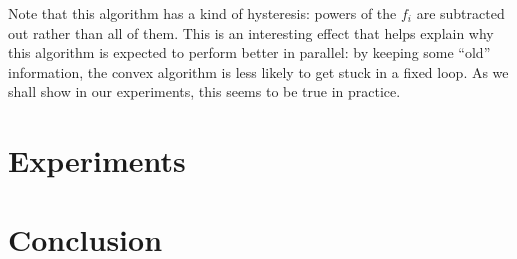 \documentclass[times, 10pt,twocolumn]{article}
\begin{document}
Note that this algorithm has a kind of hysteresis: powers of the
$f_i$ are subtracted out rather than all of them. This is an
interesting effect that helps explain why this algorithm is
expected to perform better in parallel: by keeping some ``old''
information, the convex algorithm is less likely to get stuck
in a fixed loop. As we shall show in our experiments, this seems to
be true in practice.

\section{Experiments}

\section{Conclusion}



 
\end{document}
